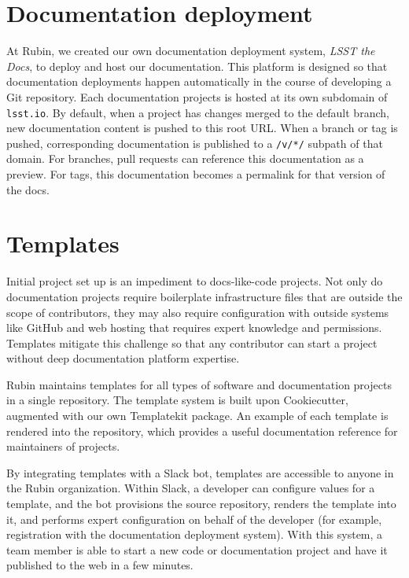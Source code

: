 \documentclass[11pt,twoside]{article}
\begin{document}
\section{Documentation deployment}


At Rubin, we created our own documentation deployment system, \textit{LSST the Docs}, to deploy and host our documentation.
This platform is designed so that documentation deployments happen automatically in the course of developing a Git repository.
Each documentation projects is hosted at its own subdomain of \texttt{lsst.io}.
By default, when a project has changes merged to the default branch, new documentation content is pushed to this root URL.
When a branch or tag is pushed, corresponding documentation is published to a \texttt{/v/*/} subpath of that domain.
For branches, pull requests can reference this documentation as a preview.
For tags, this documentation becomes a permalink for that version of the docs.

\section{Templates}

Initial project set up is an impediment to docs-like-code projects.
Not only do documentation projects require boilerplate infrastructure files that are outside the scope of contributors, they may also require configuration with outside systems like GitHub and web hosting that requires expert knowledge and permissions.
Templates mitigate this challenge so that any contributor can start a project without deep documentation platform expertise.

Rubin maintains templates for all types of software and documentation projects in a single repository.
The template system is built upon Cookiecutter, augmented with our own Templatekit package.
An example of each template is rendered into the repository, which provides a useful documentation reference for maintainers of projects.

By integrating templates with a Slack bot, templates are accessible to anyone in the Rubin organization.
Within Slack, a developer can configure values for a template, and the bot provisions the source repository, renders the template into it, and performs expert configuration on behalf of the developer (for example, registration with the documentation deployment system).
With this system, a team member is able to start a new code or documentation project and have it published to the web in a few minutes.
\end{document}
